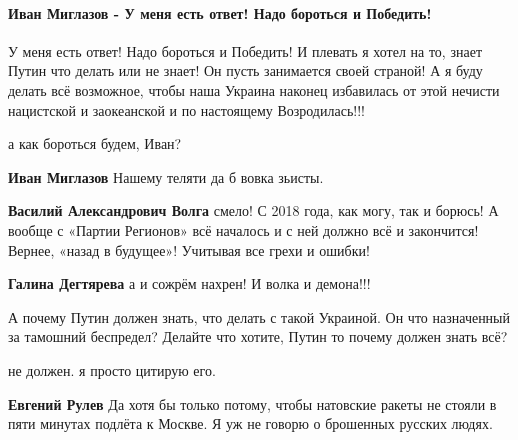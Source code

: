  
 
 
 
 
\paragraph{Иван Миглазов - У меня есть ответ! Надо бороться и Победить!}

\begin{itemize} %


У меня есть ответ! Надо бороться и Победить! И плевать я хотел на то, знает
Путин что делать или не знает! Он пусть занимается своей страной! А я буду
делать всё возможное, чтобы наша Украина наконец избавилась от этой нечисти
нацистской и заокеанской и по настоящему Возродилась!!!

\begin{itemize} %
а как бороться будем, Иван?

\textbf{Иван Миглазов} Нашему теляти да б вовка зьисты.

\textbf{Василий Александрович Волга} смело! С 2018 года, как могу, так и борюсь! А вообще с «Партии Регионов» всё началось и с ней должно всё и закончится! Вернее, «назад в будущее»! Учитывая все грехи и ошибки!

\textbf{Галина Дегтярева} а и сожрём нахрен! И волка и демона!!!
\end{itemize} %


А почему Путин должен знать, что делать с такой Украиной. Он что назначенный за
тамошний беспредел? Делайте что хотите, Путин то почему должен знать всё?

\begin{itemize} %
не должен. я просто цитирую его.

\textbf{Евгений Рулев} Да хотя бы только потому, чтобы натовские ракеты не
стояли в пяти минутах подлёта к Москве. Я уж не говорю о брошенных русских
людях.
\end{itemize} %


\end{itemize}
